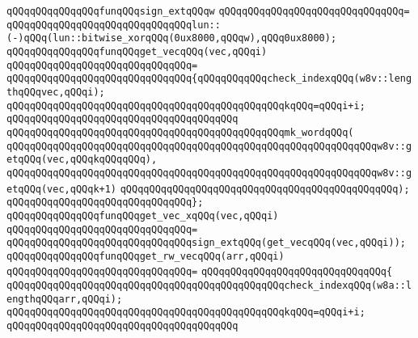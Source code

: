 \newline
\verb|qQQqqQQqqQQqqQQqfunqQQqsign_extqQQqw|\newline
\verb|qQQqqQQqqQQqqQQqqQQqqQQqqQQqqQQq=|\newline
\verb|qQQqqQQqqQQqqQQqqQQqqQQqqQQqqQQqlun::(-)qQQq(lun::bitwise_xorqQQq(0ux8000,qQQqw),qQQq0ux8000);|\newline
\newline
\verb|qQQqqQQqqQQqqQQqfunqQQqget_vecqQQq(vec,qQQqi)|\newline
\verb|qQQqqQQqqQQqqQQqqQQqqQQqqQQqqQQq=|\newline
\verb|qQQqqQQqqQQqqQQqqQQqqQQqqQQqqQQq{qQQqqQQqqQQqcheck_indexqQQq(w8v::lengthqQQqvec,qQQqi);|\newline
\verb|qQQqqQQqqQQqqQQqqQQqqQQqqQQqqQQqqQQqqQQqqQQqqQQqkqQQq=qQQqi+i;|\newline
\verb|qQQqqQQqqQQqqQQqqQQqqQQqqQQqqQQqqQQqqQQq|\newline
\verb|qQQqqQQqqQQqqQQqqQQqqQQqqQQqqQQqqQQqqQQqqQQqqQQqmk_wordqQQq(|\newline
\verb|qQQqqQQqqQQqqQQqqQQqqQQqqQQqqQQqqQQqqQQqqQQqqQQqqQQqqQQqqQQqqQQqw8v::getqQQq(vec,qQQqkqQQqqQQq),|\newline
\verb|qQQqqQQqqQQqqQQqqQQqqQQqqQQqqQQqqQQqqQQqqQQqqQQqqQQqqQQqqQQqqQQqw8v::getqQQq(vec,qQQqk+1)|\newline
\verb|qQQqqQQqqQQqqQQqqQQqqQQqqQQqqQQqqQQqqQQqqQQqqQQq);|\newline
\verb|qQQqqQQqqQQqqQQqqQQqqQQqqQQqqQQq};|\newline
\newline
\verb|qQQqqQQqqQQqqQQqfunqQQqget_vec_xqQQq(vec,qQQqi)|\newline
\verb|qQQqqQQqqQQqqQQqqQQqqQQqqQQqqQQq=|\newline
\verb|qQQqqQQqqQQqqQQqqQQqqQQqqQQqqQQqsign_extqQQq(get_vecqQQq(vec,qQQqi));|\newline
\newline
\verb|qQQqqQQqqQQqqQQqfunqQQqget_rw_vecqQQq(arr,qQQqi)|\newline
\verb|qQQqqQQqqQQqqQQqqQQqqQQqqQQqqQQq=|\newline
\verb|qQQqqQQqqQQqqQQqqQQqqQQqqQQqqQQq{|\newline
\verb|qQQqqQQqqQQqqQQqqQQqqQQqqQQqqQQqqQQqqQQqqQQqqQQqcheck_indexqQQq(w8a::lengthqQQqarr,qQQqi);|\newline
\verb|qQQqqQQqqQQqqQQqqQQqqQQqqQQqqQQqqQQqqQQqqQQqqQQqkqQQq=qQQqi+i;|\newline
\verb|qQQqqQQqqQQqqQQqqQQqqQQqqQQqqQQqqQQqqQQq|\newline
